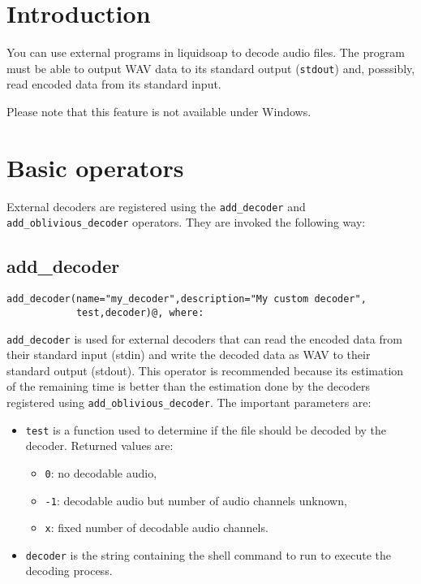 \section{Introduction}
You can use external programs in liquidsoap to decode audio files. The program must be able to
output WAV data to its standard output (\verb+stdout+) and, posssibly, read encoded data from its 
standard input.

Please note that this feature is not available under Windows.

\section{Basic operators}
External decoders are registered using the \verb+add_decoder+ and \verb+add_oblivious_decoder+ operators. 
They are invoked the following way: 

\subsection{add\_decoder}
\begin{verbatim}
add_decoder(name="my_decoder",description="My custom decoder",
            test,decoder)@, where:
\end{verbatim}
\verb+add_decoder+ is used for external decoders that can read the encoded data from their standard
input (stdin) and write the decoded data as WAV to their standard output (stdout). This operator
is recommended because its estimation of the remaining time is better than the estimation done
by the decoders registered using \verb+add_oblivious_decoder+. The important parameters are:

\begin{itemize}
\item \verb+test+ is a function used to determine if the file should be decoded by the decoder. Returned values are: \begin{itemize}
\item \verb+0+: no decodable audio, 
\item \verb+-1+: decodable audio but number of audio channels unknown, 
\item \verb+x+: fixed number of decodable audio channels.

\end{itemize}

\item \verb+decoder+ is the string containing the shell command to run to execute the decoding process.

\end{itemize}
